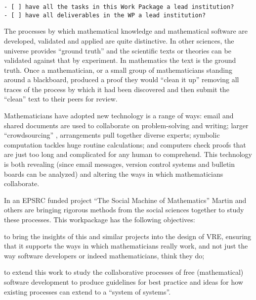 \begin{draft}
\begin{verbatim}
- [ ] have all the tasks in this Work Package a lead institution?
- [ ] have all deliverables in the WP a lead institution?
\end{verbatim}
\end{draft}



\begin{workpackage}[id=social-aspects,wphases=0-48,
  title=Social Aspects,
  lead=UO,
  UORM=53,USHRM=8, USORM=6]


\begin{wpobjectives}

The processes by which mathematical knowledge and mathematical
software are developed, validated and applied are quite
distinctive. In other sciences, the universe provides ``ground truth''
and the scientific texts or theories can be validated against that by
experiment. In mathematics the text is the ground truth. Once a
mathematician, or a small group of mathematicians standing around a
blackboard, produced a proof they would ``clean it up'' removing all
traces of the process by which it had been discovered and then submit
the ``clean'' text to their peers for review.

Mathematicians have adopted new technology is a range of ways: email
and shared documents are used to collaborate on problem-solving and
writing; larger ``crowdsourcing'' \cite{polymath_SIAM, PolymathBlog},
arrangements pull together diverse experts; symbolic computation
tackles huge routine calculations; and computers check proofs that are
just too long and complicated for any human to comprehend. This
technology is both revealing (since email messages, version control
systems and bulletin boards can be analyzed) and altering the ways in
which mathematicians collaborate.

In an EPSRC funded project ``The Social Machine of Mathematics''
Martin and others are bringing rigorous methods from the social 
sciences together to study these processes. This workpackage has the following
objectives: 
\begin{compactitem}
\item to bring the insights of this and similar projects into the
  design of \TheProject VRE, ensuring that it supports the ways in
  which mathematicians really work, and not just the way software
  developers or indeed mathematicians, think they do;
\item to extend this work to study the collaborative processes of free
  (mathematical) software development to produce guidelines for best
  practice and ideas for how existing processes can extend to a
  ``system of systems''.
\item  {}
\end{compactitem} 


\end{wpobjectives}
\end{workpackage}
